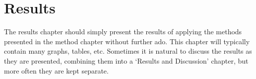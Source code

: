\chapter{Results}

The results chapter should simply present the results of applying the methods presented in the method chapter without further ado. This chapter will typically contain many graphs, tables, etc. Sometimes it is natural to discuss the results as they are presented, combining them into a ‘Results and Discussion’ chapter, but more often they are kept separate.